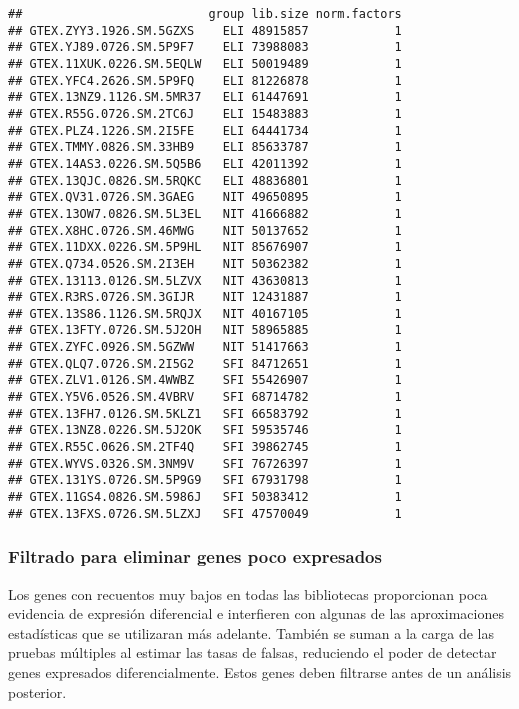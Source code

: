 \documentclass[
]{article}
\begin{document}
\begin{verbatim}
##                          group lib.size norm.factors
## GTEX.ZYY3.1926.SM.5GZXS    ELI 48915857            1
## GTEX.YJ89.0726.SM.5P9F7    ELI 73988083            1
## GTEX.11XUK.0226.SM.5EQLW   ELI 50019489            1
## GTEX.YFC4.2626.SM.5P9FQ    ELI 81226878            1
## GTEX.13NZ9.1126.SM.5MR37   ELI 61447691            1
## GTEX.R55G.0726.SM.2TC6J    ELI 15483883            1
## GTEX.PLZ4.1226.SM.2I5FE    ELI 64441734            1
## GTEX.TMMY.0826.SM.33HB9    ELI 85633787            1
## GTEX.14AS3.0226.SM.5Q5B6   ELI 42011392            1
## GTEX.13QJC.0826.SM.5RQKC   ELI 48836801            1
## GTEX.QV31.0726.SM.3GAEG    NIT 49650895            1
## GTEX.13OW7.0826.SM.5L3EL   NIT 41666882            1
## GTEX.X8HC.0726.SM.46MWG    NIT 50137652            1
## GTEX.11DXX.0226.SM.5P9HL   NIT 85676907            1
## GTEX.Q734.0526.SM.2I3EH    NIT 50362382            1
## GTEX.13113.0126.SM.5LZVX   NIT 43630813            1
## GTEX.R3RS.0726.SM.3GIJR    NIT 12431887            1
## GTEX.13S86.1126.SM.5RQJX   NIT 40167105            1
## GTEX.13FTY.0726.SM.5J2OH   NIT 58965885            1
## GTEX.ZYFC.0926.SM.5GZWW    NIT 51417663            1
## GTEX.QLQ7.0726.SM.2I5G2    SFI 84712651            1
## GTEX.ZLV1.0126.SM.4WWBZ    SFI 55426907            1
## GTEX.Y5V6.0526.SM.4VBRV    SFI 68714782            1
## GTEX.13FH7.0126.SM.5KLZ1   SFI 66583792            1
## GTEX.13NZ8.0226.SM.5J2OK   SFI 59535746            1
## GTEX.R55C.0626.SM.2TF4Q    SFI 39862745            1
## GTEX.WYVS.0326.SM.3NM9V    SFI 76726397            1
## GTEX.131YS.0726.SM.5P9G9   SFI 67931798            1
## GTEX.11GS4.0826.SM.5986J   SFI 50383412            1
## GTEX.13FXS.0726.SM.5LZXJ   SFI 47570049            1
\end{verbatim}

\hypertarget{filtrado-para-eliminar-genes-poco-expresados}{%
\subsubsection{Filtrado para eliminar genes poco
expresados}\label{filtrado-para-eliminar-genes-poco-expresados}}

Los genes con recuentos muy bajos en todas las bibliotecas proporcionan
poca evidencia de expresión diferencial e interfieren con algunas de las
aproximaciones estadísticas que se utilizaran más adelante. También se
suman a la carga de las pruebas múltiples al estimar las tasas de
falsas, reduciendo el poder de detectar genes expresados
diferencialmente. Estos genes deben filtrarse antes de un análisis
posterior.
\end{document}
